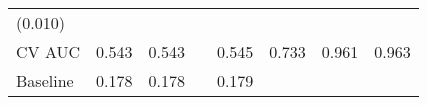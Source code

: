 \documentclass[12pt,twoside]{reedthesis}
\begin{document}
\begin{longtable}[]{@{}lccccccc@{}}
\begin{minipage}[t]{0.10\columnwidth}
  (0.010)\strut
  \end{minipage} & \begin{minipage}[t]{0.10\columnwidth}\centering\strut
  \strut
  \end{minipage} & \begin{minipage}[t]{0.10\columnwidth}\centering\strut
  \strut
  \end{minipage}\tabularnewline
  \begin{minipage}[t]{0.12\columnwidth}\raggedright\strut
  CV AUC\strut
  \end{minipage} & \begin{minipage}[t]{0.09\columnwidth}\centering\strut
  0.543\strut
  \end{minipage} & \begin{minipage}[t]{0.10\columnwidth}\centering\strut
  0.543\strut
  \end{minipage} & \begin{minipage}[t]{0.10\columnwidth}\centering\strut
  \strut
  \end{minipage} & \begin{minipage}[t]{0.10\columnwidth}\centering\strut
  0.545\strut
  \end{minipage} & \begin{minipage}[t]{0.10\columnwidth}\centering\strut
  0.733\strut
  \end{minipage} & \begin{minipage}[t]{0.10\columnwidth}\centering\strut
  0.961\strut
  \end{minipage} & \begin{minipage}[t]{0.10\columnwidth}\centering\strut
  0.963\strut
  \end{minipage}\tabularnewline
  \begin{minipage}[t]{0.12\columnwidth}\raggedright\strut
  Baseline\strut
  \end{minipage} & \begin{minipage}[t]{0.09\columnwidth}\centering\strut
  0.178\strut
  \end{minipage} & \begin{minipage}[t]{0.10\columnwidth}\centering\strut
  0.178\strut
  \end{minipage} & \begin{minipage}[t]{0.10\columnwidth}\centering\strut
  \strut
  \end{minipage} & \begin{minipage}[t]{0.10\columnwidth}\centering\strut
  0.179\strut
  \end{minipage} & \begin{minipage}[t]{0.10\columnwidth}\centering\strut

\end{minipage}
\end{longtable}
\end{document}
